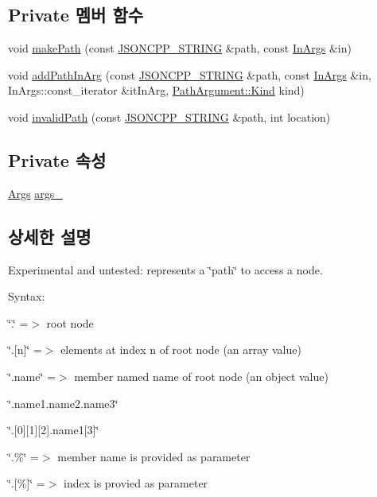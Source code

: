\subsection*{Private 멤버 함수}
\begin{DoxyCompactItemize}
\item 
void \hyperlink{class_json_1_1_path_a362a420a47acb1a1f9c79173cbfef94d}{make\+Path} (const \hyperlink{json_8h_a1e723f95759de062585bc4a8fd3fa4be}{J\+S\+O\+N\+C\+P\+P\+\_\+\+S\+T\+R\+I\+NG} \&path, const \hyperlink{class_json_1_1_path_ab29d7b2fc896c7d3c5ed4609af3a3f23}{In\+Args} \&in)
\item 
void \hyperlink{class_json_1_1_path_ae65717a5fbc35b1336cbf783b15aad2e}{add\+Path\+In\+Arg} (const \hyperlink{json_8h_a1e723f95759de062585bc4a8fd3fa4be}{J\+S\+O\+N\+C\+P\+P\+\_\+\+S\+T\+R\+I\+NG} \&path, const \hyperlink{class_json_1_1_path_ab29d7b2fc896c7d3c5ed4609af3a3f23}{In\+Args} \&in, In\+Args\+::const\+\_\+iterator \&it\+In\+Arg, \hyperlink{class_json_1_1_path_argument_a2420bbad778573c147e578701b84d9b9}{Path\+Argument\+::\+Kind} kind)
\item 
void \hyperlink{class_json_1_1_path_a0fa77fc0cefefcfcf2f1242c79009dd9}{invalid\+Path} (const \hyperlink{json_8h_a1e723f95759de062585bc4a8fd3fa4be}{J\+S\+O\+N\+C\+P\+P\+\_\+\+S\+T\+R\+I\+NG} \&path, int location)
\end{DoxyCompactItemize}
\subsection*{Private 속성}
\begin{DoxyCompactItemize}
\item 
\hyperlink{class_json_1_1_path_a27d96232d034d7a78286468676f9cb3e}{Args} \hyperlink{class_json_1_1_path_af33d0de7ee9f99d3e361bdf504dc2bc7}{args\+\_\+}
\end{DoxyCompactItemize}


\subsection{상세한 설명}
Experimental and untested\+: represents a \char`\"{}path\char`\"{} to access a node. 

Syntax\+:
\begin{DoxyItemize}
\item \char`\"{}.\char`\"{} =$>$ root node
\item \char`\"{}.\mbox{[}n\mbox{]}\char`\"{} =$>$ elements at index \textquotesingle{}n\textquotesingle{} of root node (an array value)
\item \char`\"{}.\+name\char`\"{} =$>$ member named \textquotesingle{}name\textquotesingle{} of root node (an object value)
\item \char`\"{}.\+name1.\+name2.\+name3\char`\"{}
\item \char`\"{}.\mbox{[}0\mbox{]}\mbox{[}1\mbox{]}\mbox{[}2\mbox{]}.\+name1\mbox{[}3\mbox{]}\char`\"{}
\item \char`\"{}.\%\char`\"{} =$>$ member name is provided as parameter
\item \char`\"{}.\mbox{[}\%\mbox{]}\char`\"{} =$>$ index is provied as parameter 
\end{DoxyItemize}

